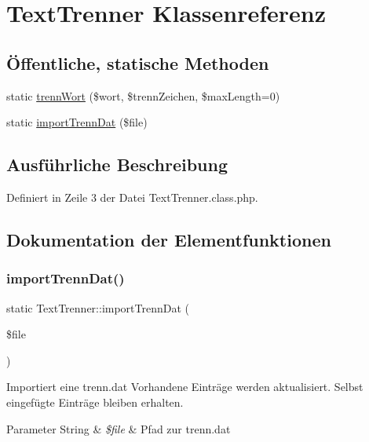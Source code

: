 \hypertarget{class_text_trenner}{}\section{Text\+Trenner Klassenreferenz}
\label{class_text_trenner}
\subsection*{Öffentliche, statische Methoden}
\begin{DoxyCompactItemize}
\item 
static \mbox{\hyperlink{class_text_trenner_a58fe9b3b283cb65c62d165d4b50f5275}{trenn\+Wort}} (\$wort, \$trenn\+Zeichen, \$max\+Length=0)
\item 
static \mbox{\hyperlink{class_text_trenner_ac15b95562b7542ced9e79a944482dee4}{import\+Trenn\+Dat}} (\$file)
\end{DoxyCompactItemize}


\subsection{Ausführliche Beschreibung}


Definiert in Zeile 3 der Datei Text\+Trenner.\+class.\+php.



\subsection{Dokumentation der Elementfunktionen}
\mbox{\label{class_text_trenner_ac15b95562b7542ced9e79a944482dee4}} 
\subsubsection{\texorpdfstring{import\+Trenn\+Dat()}{importTrennDat()}}
{\footnotesize\ttfamily static Text\+Trenner\+::import\+Trenn\+Dat (\begin{DoxyParamCaption}\item[{}]{\$file }\end{DoxyParamCaption})\hspace{0.3cm}{\ttfamily [static]}}

Importiert eine trenn.\+dat Vorhandene Einträge werden aktualisiert. Selbst eingefügte Einträge bleiben erhalten. 
\begin{DoxyParams}[1]{Parameter}
String & {\em \$file} & Pfad zur trenn.\+dat \\
\hline
\end{DoxyParams}


